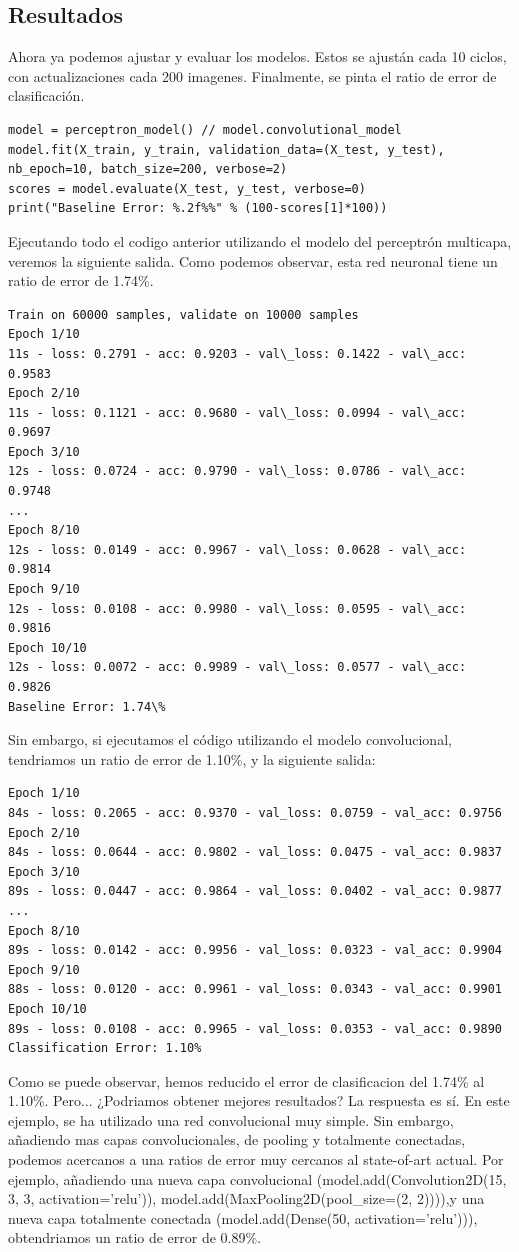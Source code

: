 \subsection{Resultados}
Ahora ya podemos ajustar y evaluar los modelos. Estos se ajustán cada 10 ciclos, con actualizaciones cada 200 imagenes. Finalmente, se pinta  el ratio de error de clasificación.
\begin{verbatim}
model = perceptron_model() // model.convolutional_model
model.fit(X_train, y_train, validation_data=(X_test, y_test), nb_epoch=10, batch_size=200, verbose=2)
scores = model.evaluate(X_test, y_test, verbose=0)
print("Baseline Error: %.2f%%" % (100-scores[1]*100))
\end{verbatim}
Ejecutando todo el codigo anterior utilizando el modelo del perceptrón multicapa, veremos la siguiente salida. Como podemos observar, esta red neuronal tiene un ratio de error de 1.74\%.
\begin{verbatim}
Train on 60000 samples, validate on 10000 samples
Epoch 1/10
11s - loss: 0.2791 - acc: 0.9203 - val\_loss: 0.1422 - val\_acc: 0.9583
Epoch 2/10
11s - loss: 0.1121 - acc: 0.9680 - val\_loss: 0.0994 - val\_acc: 0.9697
Epoch 3/10
12s - loss: 0.0724 - acc: 0.9790 - val\_loss: 0.0786 - val\_acc: 0.9748
...
Epoch 8/10
12s - loss: 0.0149 - acc: 0.9967 - val\_loss: 0.0628 - val\_acc: 0.9814
Epoch 9/10
12s - loss: 0.0108 - acc: 0.9980 - val\_loss: 0.0595 - val\_acc: 0.9816
Epoch 10/10
12s - loss: 0.0072 - acc: 0.9989 - val\_loss: 0.0577 - val\_acc: 0.9826
Baseline Error: 1.74\%
\end{verbatim}
Sin embargo, si ejecutamos el código utilizando el modelo convolucional, tendriamos un ratio de error de 1.10\%, y la siguiente salida:
\begin{verbatim}
Epoch 1/10
84s - loss: 0.2065 - acc: 0.9370 - val_loss: 0.0759 - val_acc: 0.9756
Epoch 2/10
84s - loss: 0.0644 - acc: 0.9802 - val_loss: 0.0475 - val_acc: 0.9837
Epoch 3/10
89s - loss: 0.0447 - acc: 0.9864 - val_loss: 0.0402 - val_acc: 0.9877
...
Epoch 8/10
89s - loss: 0.0142 - acc: 0.9956 - val_loss: 0.0323 - val_acc: 0.9904
Epoch 9/10
88s - loss: 0.0120 - acc: 0.9961 - val_loss: 0.0343 - val_acc: 0.9901
Epoch 10/10
89s - loss: 0.0108 - acc: 0.9965 - val_loss: 0.0353 - val_acc: 0.9890
Classification Error: 1.10%
\end{verbatim}
Como se puede observar, hemos reducido el error de clasificacion del 1.74\% al 1.10\%. Pero... ¿Podriamos obtener mejores resultados? La respuesta es sí. En este ejemplo, se ha utilizado una red convolucional muy simple. Sin embargo, añadiendo mas capas convolucionales, de pooling y totalmente conectadas, podemos acercanos a una ratios de error muy cercanos al state-of-art actual. Por ejemplo, añadiendo una nueva capa convolucional (model.add(Convolution2D(15, 3, 3, activation='relu')), model.add(MaxPooling2D(pool\_size=(2, 2)))),y una nueva capa totalmente conectada (model.add(Dense(50, activation='relu'))), obtendriamos un ratio de error de  0.89\%.

